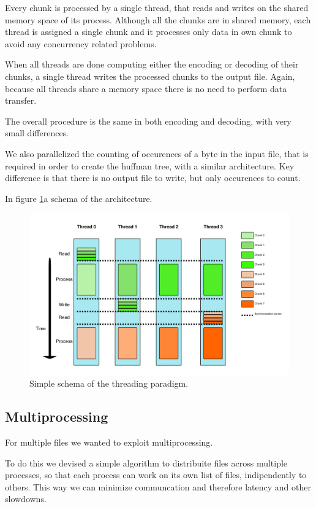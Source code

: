 Every chunk is processed by a single thread, that reads and writes on the shared memory space of its process. Although all the chunks are in shared memory, each thread is assigned a single chunk and it processes only data in own chunk to avoid any concurrency related problems.

When all threads are done  computing either the encoding or decoding of their chunks, a single thread writes the processed chunks to the output file.
Again, because all threads share a memory space there is no need to perform data transfer.


The overall procedure is the same in both encoding and decoding, with very small differences. 

We also parallelized the counting of occurences of a byte in the input file, that is required in order to create the huffman tree, with a similar architecture.  Key difference is that there is no output file to write, but only occurences to count.

In figure \ref{fig:threading}a schema of the architecture. 

\begin{figure}
	\centering
	\includegraphics[width=0.8\linewidth]{../imgs/threading}
	\caption{Simple schema of the threading paradigm.}
	\label{fig:threading}
\end{figure}


\subsection{Multiprocessing}

For multiple files we wanted to exploit multiprocessing.

To do this we devised a simple algorithm to distribuite files across multiple processes, so that each process can work on its own list of files, indipendently to others. This way we can minimize communcation and therefore latency and other slowdowns.


